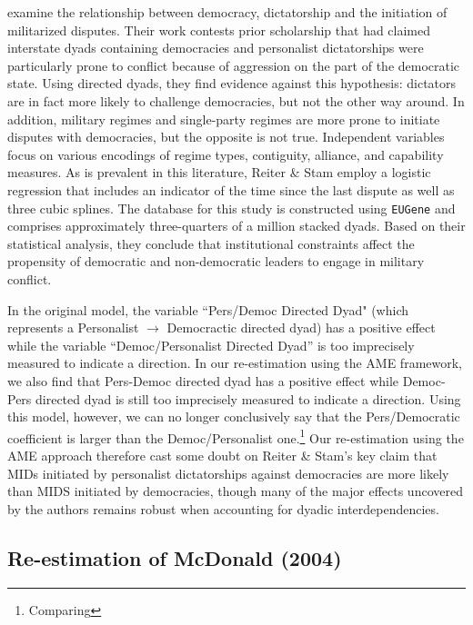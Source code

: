 \citet{reiter:stam:2003} examine the relationship between democracy, dictatorship and the initiation of militarized disputes. Their work contests prior scholarship that had claimed interstate dyads containing democracies and personalist dictatorships were particularly prone to conflict because of aggression on the part of the democratic state. Using directed dyads, they find evidence against this hypothesis: dictators are in fact more likely to challenge democracies, but not the other way around.  In addition, military regimes and single-party regimes are more prone to initiate disputes with democracies, but the opposite is not true. Independent variables focus on various encodings of regime types, contiguity, alliance, and capability measures. As is prevalent in this literature, Reiter \& Stam employ a logistic regression that includes an indicator of the time since the last dispute as well as three cubic splines. The database for this study is constructed using \texttt{EUGene} \citep{bennett:stam:2000} and comprises approximately three-quarters of a million stacked dyads. Based on their statistical analysis, they conclude that institutional constraints affect the propensity of democratic and non-democratic leaders to engage in military conflict. 

In the original model, the variable ``Pers/Democ Directed Dyad" (which represents a Personalist $\rightarrow$ Democractic directed dyad) has a positive effect while the variable ``Democ/Personalist Directed Dyad'' is too imprecisely measured to indicate a direction. In our re-estimation using the AME framework, we also find that Pers-Democ directed dyad has a positive effect while Democ-Pers directed dyad is still too imprecisely measured to indicate a direction. Using this model, however, we can no longer conclusively say that the Pers/Democratic coefficient is larger than the Democ/Personalist one.\footnote{Comparing } Our re-estimation using the AME approach therefore cast some doubt on Reiter \& Stam's key claim that MIDs initiated by personalist dictatorships against democracies are more likely than MIDS initiated by democracies, though many of the major effects  uncovered by the authors remains robust when accounting for dyadic interdependencies. %

\subsection{Re-estimation of McDonald (2004)}

